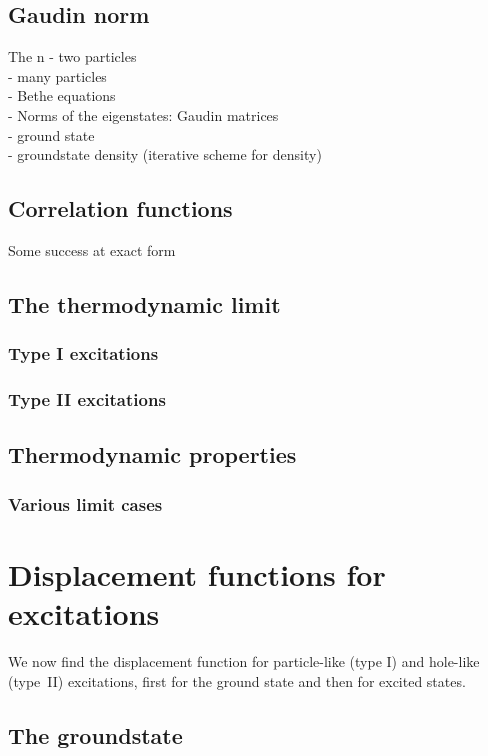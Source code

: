 \documentclass[11pt, a4paper,draft]{report} %
\begin{document}
\subsection{Gaudin norm}
The n
- two particles \\
- many particles\\
- Bethe equations\\
- Norms of the eigenstates: Gaudin matrices\\
- ground state\\
- groundstate density (iterative scheme for density)\cite{Zemyan2012}

\subsection{Correlation functions}
Some success at exact form \cite{Nardis2016}
\cite{slavnov89_calcul_scalar_produc_wave_funct}
\cite{slavnov90_noneq_time_curren_correl_funct}

\subsection{The thermodynamic limit}

\subsubsection{Type I excitations}

\subsubsection{Type II excitations}

\subsection{Thermodynamic properties}

\subsubsection{Various limit cases}


\section{Displacement functions for excitations}
We now find the displacement function for particle-like (type I) and hole-like (type~II) excitations, first for the ground state and then for excited states.

\subsection{The groundstate}
\end{document}
